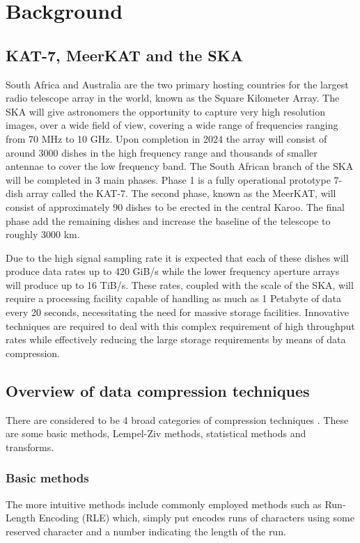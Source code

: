 \documentclass{acm_proc_article-sp}
\begin{document}
\section{Background}
\subsection{KAT-7, MeerKAT and the SKA}
South Africa and Australia are the two primary hosting countries for the largest radio telescope array in the world, known as the Square Kilometer Array. 
The SKA will give astronomers the opportunity to capture very high resolution images, over a wide field of view, covering a wide range of frequencies ranging 
from 70 MHz to 10 GHz. Upon completion in 2024 the array will consist of around 3000 dishes in the high frequency range and thousands of smaller antennae to 
cover the low frequency band. The South African branch of the SKA will be completed in 3 main phases. Phase 1 is a fully operational prototype 7-dish array 
called the KAT-7. The second phase, known as the MeerKAT, will consist of approximately 90 dishes to be erected in the central Karoo. The final phase add 
the remaining dishes and increase the baseline of the telescope to roughly 3000 km.

Due to the high signal sampling rate it is expected that each of these dishes will produce data rates up to 420 GiB/s while the lower frequency aperture arrays 
will produce up to 16 TiB/s. These rates, coupled with the scale of the SKA, will require a processing facility capable of handling as much as 1 Petabyte of 
data every 20 seconds, necessitating the need for massive storage facilities. Innovative techniques are required to deal with this complex requirement of high 
throughput rates while effectively reducing the large storage requirements by means of data compression.
\subsection{Overview of data compression techniques}
There are considered to be 4 broad categories of compression techniques \cite{salomon2004data}. These are some basic methods, Lempel-Ziv methods, statistical methods 
and transforms.
\subsubsection{Basic methods}
The more intuitive methods include commonly employed methods such as Run-Length Encoding (RLE) which, simply put encodes runs of characters using some reserved 
character and a number indicating the length of the run.
\end{document}
